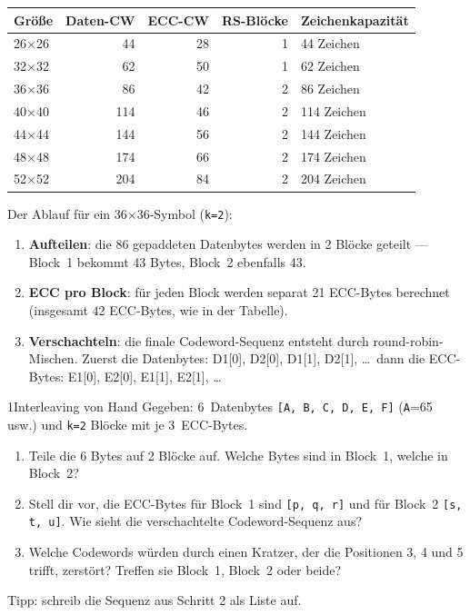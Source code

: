 \begin{center}
\begin{tabular}{lrrrl}
\toprule
Größe & Daten-CW & ECC-CW & RS-Blöcke & Zeichenkapazität \\
\midrule
26×26 &  44 &  28 & 1 &  44 Zeichen \\
32×32 &  62 &  50 & 1 &  62 Zeichen \\
\midrule
36×36 &  86 &  42 & 2 &  86 Zeichen \\
40×40 & 114 &  46 & 2 & 114 Zeichen \\
44×44 & 144 &  56 & 2 & 144 Zeichen \\
48×48 & 174 &  66 & 2 & 174 Zeichen \\
52×52 & 204 &  84 & 2 & 204 Zeichen \\
\bottomrule
\end{tabular}
\end{center}

Der Ablauf für ein 36×36-Symbol (\texttt{k=2}):

\begin{enumerate}
\item \textbf{Aufteilen}: die 86 gepadde\-ten Datenbytes werden in
  2 Blöcke geteilt — Block~1 bekommt 43 Bytes, Block~2 ebenfalls 43.
\item \textbf{ECC pro Block}: für jeden Block werden separat 21 ECC-Bytes
  berechnet (insgesamt 42 ECC-Bytes, wie in der Tabelle).
\item \textbf{Verschachteln}: die finale Codeword-Sequenz entsteht
  durch round-robin-Mischen. Zuerst die Datenbytes:
  D1[0], D2[0], D1[1], D2[1], \ldots\ dann die ECC-Bytes:
  E1[0], E2[0], E1[1], E2[1], \ldots

\end{enumerate}

\begin{bleistiftuebung}{1}{Interleaving von Hand}
Gegeben: 6~Datenbytes \texttt{[A, B, C, D, E, F]}
(\texttt{A}=65 usw.) und \texttt{k=2} Blöcke mit je 3~ECC-Bytes.

\begin{enumerate}
\item Teile die 6 Bytes auf 2 Blöcke auf. Welche Bytes sind in Block~1,
  welche in Block~2?
\item Stell dir vor, die ECC-Bytes für Block~1 sind \texttt{[p, q, r]}
  und für Block~2 \texttt{[s, t, u]}. Wie sieht die verschachtelte
  Codeword-Sequenz aus?
\item Welche Codewords würden durch einen Kratzer, der die Positionen
  3, 4 und 5 trifft, zerstört? Treffen sie Block~1, Block~2 oder beide?
\end{enumerate}

Tipp: schreib die Sequenz aus Schritt 2 als Liste auf.
\end{bleistiftuebung}

